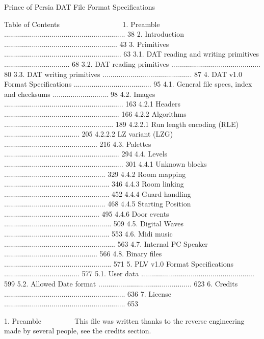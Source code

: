              
                  Prince of Persia DAT File Format
                           Specifications

Table of Contents
~~~~~ ~~ ~~~~~~~~
1. Preamble ............................................................. 38
2. Introduction ......................................................... 43
3. Primitives ........................................................... 63
3.1. DAT reading and writing primitives ................................. 68
3.2. DAT reading primitives ............................................. 80
3.3. DAT writing primitives ............................................. 87
4. DAT v1.0 Format Specifications ....................................... 95
4.1. General file specs, index and checksums ............................ 98
4.2. Images ............................................................ 163
4.2.1 Headers .......................................................... 166
4.2.2 Algorithms ....................................................... 189
4.2.2.1 Run length encoding (RLE) ...................................... 205
4.2.2.2 LZ variant (LZG) ............................................... 216
4.3. Palettes .......................................................... 294
4.4. Levels ............................................................ 301
4.4.1 Unknown blocks ................................................... 329
4.4.2 Room mapping ..................................................... 346
4.4.3 Room linking ..................................................... 452
4.4.4 Guard handling ................................................... 468
4.4.5 Starting Position ................................................ 495
4.4.6 Door events ...................................................... 509
4.5. Digital Waves ..................................................... 553
4.6. Midi music ........................................................ 563
4.7. Internal PC Speaker ............................................... 566
4.8. Binary files ...................................................... 571
5. PLV v1.0 Format Specifications ...................................... 577
5.1. User data ......................................................... 599
5.2. Allowed Date format ............................................... 623
6. Credits ............................................................. 636
7. License ............................................................. 653

1. Preamble
   ~~~~~~~~
 This file was written thanks to the reverse engineering made by several
 people, see the credits section.

